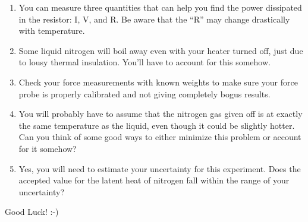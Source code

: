 \begin{enumerate}

\item You can measure three quantities that can help you find the power
dissipated in the resistor: I, V, and R. Be aware that the ``R'' may change drastically with temperature.

\item Some liquid nitrogen will boil away even with your heater turned off, just due to lousy thermal insulation. You'll have to account for this somehow.

\item Check your force measurements with known weights to make sure your force probe is properly calibrated and not giving completely bogus results.

\item You will probably have to assume that the nitrogen gas given off is at exactly the same temperature as the liquid, even though it could be slightly hotter. Can you think of some good ways to either minimize this problem or account for it somehow?

\item Yes, you will need to estimate your uncertainty for this experiment. Does the accepted value for the latent heat of nitrogen fall within the range of your uncertainty?

\end{enumerate}

Good Luck!  :-)
